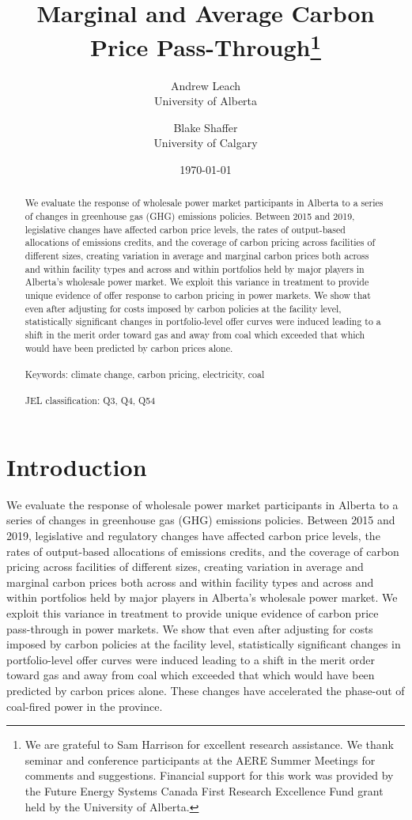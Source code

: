 \documentclass[12pt]{article}
\title{Marginal and Average Carbon Price Pass-Through\thanks{We are grateful to Sam Harrison for excellent
research assistance. We thank seminar and conference participants at the AERE Summer Meetings for comments and suggestions. Financial support for this work was provided by the Future Energy Systems Canada First Research Excellence Fund grant held by the University of Alberta.}
}
\date{\today}
\author{Andrew Leach\\
 University of Alberta
 \and
Blake Shaffer\\University of Calgary}
\begin{document}
\maketitle




\begin{abstract}
\noindent We evaluate the response of wholesale power market participants in Alberta to a series of changes in greenhouse gas (GHG) emissions policies.  Between 2015 and 2019, legislative changes have affected carbon price levels, the rates of output-based allocations of emissions credits, and the coverage of carbon pricing across facilities of different sizes, creating variation in average and marginal carbon prices both across and within facility types and across and within portfolios held by major players in Alberta's wholesale power market. We exploit this variance in treatment to provide unique evidence of offer response to carbon pricing in power markets. We show that even after adjusting for costs imposed by carbon policies at the facility level, statistically significant changes in portfolio-level offer curves were induced leading to a shift in the merit order toward gas and away from coal which exceeded that which would have been predicted by carbon prices alone.\\ \\
Keywords: climate change, carbon pricing, electricity, coal\\ \\
JEL classification: Q3, Q4, Q54
\end{abstract}

\thispagestyle{empty}
\newpage
\onehalfspacing


\section{Introduction}

We evaluate the response of wholesale power market participants in Alberta to a series of changes in greenhouse gas (GHG) emissions policies.  Between 2015 and 2019, legislative and regulatory changes have affected carbon price levels, the rates of output-based allocations of emissions credits, and the coverage of carbon pricing across facilities of different sizes, creating variation in average and marginal carbon prices both across and within facility types and across and within portfolios held by major players in Alberta's wholesale power market. We exploit this variance in treatment to provide unique evidence of carbon price pass-through in power markets. We show that even after adjusting for costs imposed by carbon policies at the facility level, statistically significant changes in portfolio-level offer curves were induced leading to a shift in the merit order toward gas and away from coal which exceeded that which would have been predicted by carbon prices alone. These changes have accelerated the phase-out of coal-fired power in the province.
\end{document}
